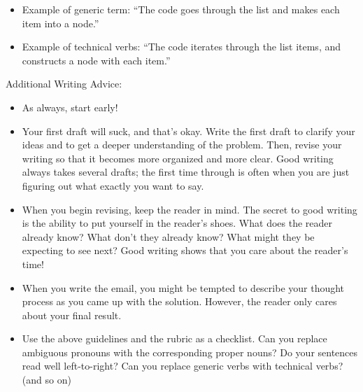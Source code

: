 \documentclass{article}
\begin{document}
\begin{itemize}
\begin{itemize}
\item Example of generic term: “The code goes through the list and makes each item into a node.”
\item Example of technical verbs: “The code iterates through the list items, and constructs a node with each item.”
\end{itemize}
Additional Writing Advice:
\begin{itemize}
\item As always, start early!
\item Your first draft will suck, and that’s okay. Write the first draft to clarify your ideas and to get a deeper understanding
of the problem. Then, revise your writing so that it becomes more organized and more clear. Good writing always
takes several drafts; the first time through is often when you are just figuring out what exactly you want to say.
\item When you begin revising, keep the reader in mind. The secret to good writing is the ability to put yourself in the
reader’s shoes. What does the reader already know? What don’t they already know? What might they be expecting
to see next? Good writing shows that you care about the reader’s time!
\item When you write the email, you might be tempted to describe your thought process as you came up with the solution.
However, the reader only cares about your final result.
\item Use the above guidelines and the rubric as a checklist. Can you replace ambiguous pronouns with the corresponding
proper nouns? Do your sentences read well left-to-right? Can you replace generic verbs with technical verbs? (and so
on)
\end{itemize}
\end{itemize}
\end{document}
